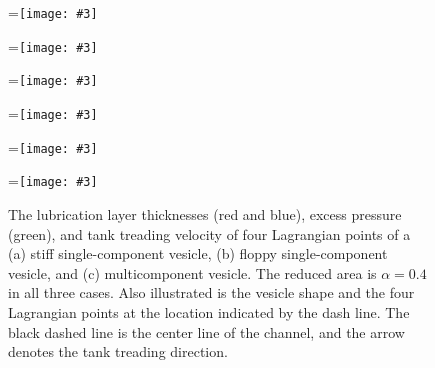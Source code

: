 \documentclass[twoside,twocolumn,9pt]{article}
\newcommand{\subfigimg}[3][,]{%
  \setbox1=\hbox{\texttt{[image: \#3]}}%
  \leavevmode\rlap{\usebox1}%
  \rlap{\hspace*{0pt}\raisebox{\dimexpr\ht1-0\baselineskip}{\bf
  \normalsize #2}}%
  \phantom{\usebox1}%
}
\begin{document}
\begin{figure}[t]
  \centering
  \subfigimg[width=0.3\linewidth]{(a)}{figures/Layer_Size_RAp4_SC.pdf}
  \subfigimg[width=0.3\linewidth]{(b)}{figures/Layer_Size_RAp4_SCp55.pdf}
  \subfigimg[width=0.3\linewidth]{(c)}{figures/Layer_Size_RAp4_MCp5.pdf}
  \subfigimg[width=0.3\linewidth,trim=0cm 6cm 28cm 0cm,clip=true]{}{figures/TankTreadingFigs_composite_SC.pdf}
  \subfigimg[width=0.3\linewidth,trim=0cm 6cm 28cm
  0cm,clip=true]{}{figures/TankTreadingFigs_composite_SCp55.pdf}
  \subfigimg[width=0.3\linewidth,trim=0cm 6cm 28cm
  0cm,clip=true]{}{figures/TankTreadingFigs_composite_MCp5.pdf}
  \caption{\label{fig:lubricationComposite} \small The lubrication layer
  thicknesses (red and blue), excess pressure (green), and tank treading
  velocity of four Lagrangian points of a (a) stiff single-component
  vesicle, (b) floppy single-component vesicle, and (c) multicomponent
  vesicle. The reduced area is $\alpha = 0.4$ in all three cases. Also
  illustrated is the vesicle shape and the four Lagrangian points at the
  location indicated by the dash line. The black dashed line is the
  center line of the channel, and the arrow denotes the tank treading
  direction.}
\end{figure}
\end{document}
